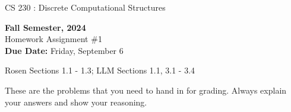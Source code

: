 \setlength{\oddsidemargin}{12pt}
\setlength{\textwidth}{6.5in}
\setlength{\textheight}{9in}
\pagestyle{empty}
\setlength{\parskip}{7pt plus 2pt minus 2pt}



\begin{center}
{{\large CS 230 : Discrete Computational Structures}}\\

\vspace*{1cm}

{\bf Fall Semester, 2024}\\

{\sc Homework Assignment \#1}\\
{\bf Due Date:}  Friday, September 6
\end{center}

 Rosen Sections 1.1 - 1.3; LLM Sections 1.1,  3.1 - 3.4

These are the problems that you need to hand in for grading. Always
explain your answers and show your reasoning.

